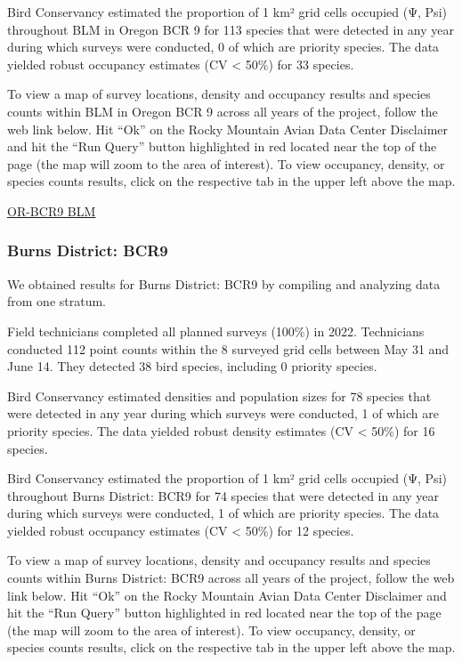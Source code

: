 \documentclass[
  letterpaper,
  DIV=11,
  numbers=noendperiod,
  oneside]{scrreprt}
\begin{document}
Bird Conservancy estimated the proportion of 1 km² grid cells occupied
(Ψ, Psi) throughout BLM in Oregon BCR 9 for 113 species that were
detected in any year during which surveys were conducted, 0 of which are
priority species. The data yielded robust occupancy estimates (CV
\textless{} 50\%) for 33 species.

To view a map of survey locations, density and occupancy results and
species counts within BLM in Oregon BCR 9 across all years of the
project, follow the web link below. Hit ``Ok'' on the Rocky Mountain
Avian Data Center Disclaimer and hit the ``Run Query'' button
highlighted in red located near the top of the page (the map will zoom
to the area of interest). To view occupancy, density, or species counts
results, click on the respective tab in the upper left above the map.

\href{http://www.rmbo.org/new_site/adc/QueryWindow.aspx\#N4IgzgrgDgpgTmALnAhoiBbEAuABCAeQCUBaAIQGEiBOXMgGQFkQBfIA}{OR-BCR9
BLM}

\hypertarget{burns-district-bcr9}{%
\subsubsection{Burns District: BCR9}\label{burns-district-bcr9}}

We obtained results for Burns District: BCR9 by compiling and analyzing
data from one stratum.

Field technicians completed all planned surveys (100\%) in 2022.
Technicians conducted 112 point counts within the 8 surveyed grid cells
between May 31 and June 14. They detected 38 bird species, including 0
priority species.

Bird Conservancy estimated densities and population sizes for 78 species
that were detected in any year during which surveys were conducted, 1 of
which are priority species. The data yielded robust density estimates
(CV \textless{} 50\%) for 16 species.

Bird Conservancy estimated the proportion of 1 km² grid cells occupied
(Ψ, Psi) throughout Burns District: BCR9 for 74 species that were
detected in any year during which surveys were conducted, 1 of which are
priority species. The data yielded robust occupancy estimates (CV
\textless{} 50\%) for 12 species.

To view a map of survey locations, density and occupancy results and
species counts within Burns District: BCR9 across all years of the
project, follow the web link below. Hit ``Ok'' on the Rocky Mountain
Avian Data Center Disclaimer and hit the ``Run Query'' button
highlighted in red located near the top of the page (the map will zoom
to the area of interest). To view occupancy, density, or species counts
results, click on the respective tab in the upper left above the map.
\end{document}
